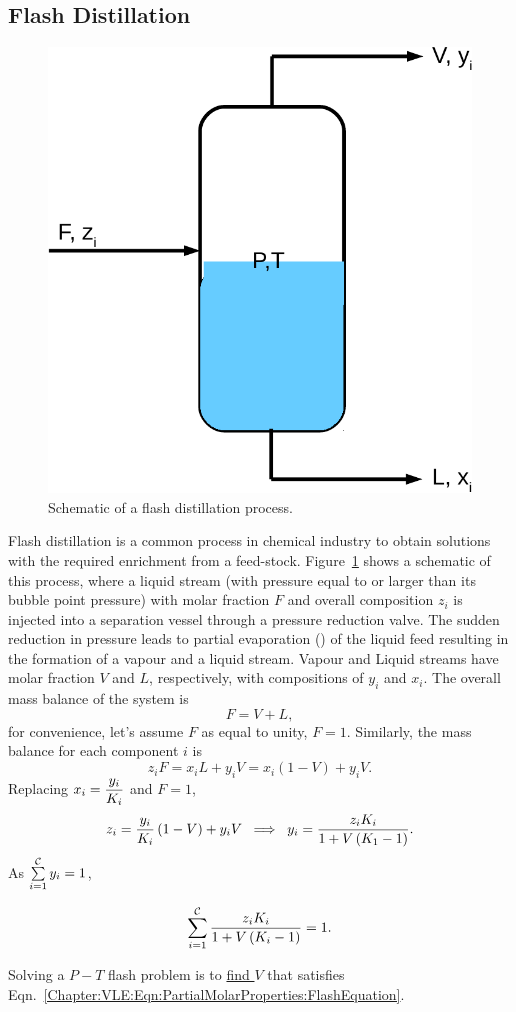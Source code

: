 \subsection{Flash Distillation}\label{Chapter:VLE:Section:FlashDistillation}
  \begin{figure}[h]
     \begin{center}
         \includegraphics[width=.4\textwidth,clip]{./Figs/FlashDistillation}
     \end{center}
     \caption{Schematic of a flash distillation process.}\label{Chapter:VLE:Fig:Fig06}
  \end{figure}
Flash distillation is a common process in chemical industry to obtain solutions with the required enrichment from a feed-stock. Figure~\ref{Chapter:VLE:Fig:Fig06} shows a schematic of this process, where a liquid stream (\ie with pressure equal to or larger than its bubble point pressure) with molar fraction $F$ and overall composition $z_{i}$ is injected into a separation vessel through a pressure reduction valve. The sudden reduction in pressure leads to partial evaporation () of the liquid feed resulting in the formation of a vapour and a liquid stream. Vapour and Liquid streams have molar fraction $V$ and $L$, respectively, with compositions of $y_{i}$ and $x_{i}$. 
  The overall mass balance of the system is
  \begin{displaymath}
     F = V + L,
  \end{displaymath}
  for convenience, let's assume $F$ as equal to unity, $F=1$. Similarly, the mass balance for each component $i$ is
  \begin{displaymath}
     z_{i}F = x_{i}L + y_{i}V = x_{i}\left(1-V\right) + y_{i}V.
  \end{displaymath}
  Replacing $x_{i} = \frc{y_{i}}{K_{i}}$ and $F=1$,
  \begin{displaymath}
     z_{i} = \frc{y_{i}}{K_{i}}\left(1-V\right) + y_{i}V \;\;\Longrightarrow \;\;y_{i} = \frc{z_{i}K_{i}}{1+V\left(K_{1}-1\right)}. 
  \end{displaymath}
  As $\summation[y_{i}]{i=1}{\mathcal{C}} = 1$,
         \begin{shaded}
           \begin{equation}
              \summation[\frc{z_{i}K_{i}}{1+V\left(K_{i}-1\right)}]{i=1}{\mathcal{C}} = 1.\label{Chapter:VLE:Eqn:PartialMolarProperties:FlashEquation} 
           \end{equation}
         \end{shaded}
         Solving a $P-T$ flash problem is to \underline{find $V$} that satisfies Eqn.~\ref{Chapter:VLE:Eqn:PartialMolarProperties:FlashEquation}.

